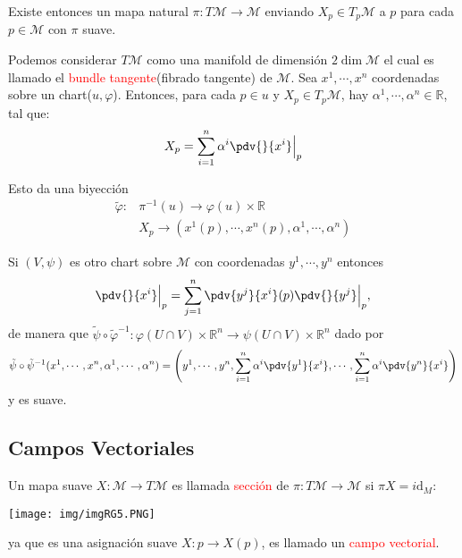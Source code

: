 \documentclass[../main]{subfiles}
\begin{document}
\begin{adjustwidth}{0pt}{-100pt}
Existe entonces un mapa natural $\pi: T\mathcal{M}\rightarrow \mathcal{M}$ enviando $X_p \in T_p \mathcal{M}$ a $p$ para cada $p\in \mathcal{M}$ con $\pi$ suave.

Podemos considerar $T\mathcal{M}$ como una manifold de dimensión $2\dim \mathcal{M}$ el cual es llamado el \textcolor{red}{bundle tangente}(fibrado tangente) de $\mathcal{M}$. Sea $x^1, \cdots, x^n$ coordenadas sobre un chart($u, \varphi$). Entonces, para cada $p\in u$ y $X_p \in T_p \mathcal{M}$, hay $\alpha^1, \cdots, \alpha^n \in \mathbb{R}$, tal que:
\begin{equation}
    X_p=\sum_{i=1}^n \alpha^{i} \pdv{}{x^{i}}\Big{|}_p
\end{equation}

Esto da una biyección 
\begin{equation}
    \begin{split}
        \tilde{\varphi}: &\pi^{-1}(u)\rightarrow \varphi(u)\times \mathbb{R}\\
        &X_p \rightarrow (x^1(p), \cdots, x^n(p), \alpha^1, \cdots, \alpha^n)
    \end{split}
\end{equation}

Si $(V, \psi)$ es otro chart sobre $\mathcal{M}$ con coordenadas $y^1, \cdots, y^n$ entonces 
\begin{equation}
    \pdv{}{x^{i}}\Big{|}_p=\sum_{j=1}^n \pdv{y^j}{x^{i}}(p)\pdv{}{y^j}\Big{|}_p,
\end{equation}
de manera que $\tilde{\psi} \circ \tilde{\varphi}^{-1}: \varphi(U \cap V)\times \mathbb{R}^n \rightarrow \psi(U \cap V) \times \mathbb{R}^n$ dado por 
\begin{equation}
    \tilde{\psi}\circ \tilde{\psi}^{-1}(x^1, \cdots, x^n, \alpha^1, \cdots, \alpha^n)=\left(y^1, \cdots, y^n, \sum_{i=1}^n \alpha^{i}\pdv{y^1}{x^{i}}, \cdots, \sum_{i=1}^n \alpha^{i}\pdv{y^n}{x^{i}}\right)
\end{equation}
y es suave.

\subsection{Campos Vectoriales}
Un mapa suave $X: \mathcal{M} \rightarrow T\mathcal{M}$ es llamada \textcolor{red}{sección} de $\pi: T \mathcal{M}\rightarrow \mathcal{M}$ si $\pi X=i\mathrm{d}_M$:
\begin{center}
    \texttt{[image: img/imgRG5.PNG]}
\end{center}
ya que es una asignación suave $X:p\rightarrow X(p)$, es llamado un \textcolor{red}{campo vectorial}.


\end{adjustwidth}
\end{document}
